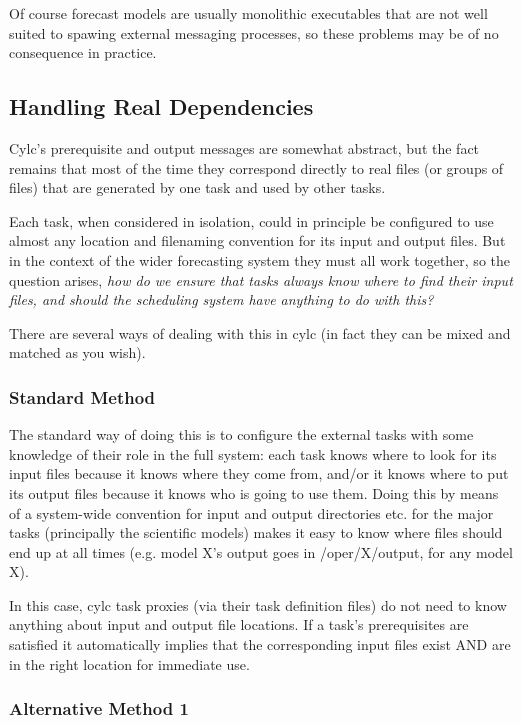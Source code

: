\documentclass[11pt,a4paper]{article}
\begin{document}
Of course forecast models are usually monolithic executables that are not
well suited to spawing external messaging processes, so these problems
may be of no consequence in practice.

\pagebreak

\subsection{Handling Real Dependencies}
\label{HandlingRealDependencies}

Cylc's prerequisite and output messages are somewhat abstract, but the
fact remains that most of the time they correspond directly to real 
files (or groups of files) that are generated by one task and used by
other tasks.

Each task, when considered in isolation, could in principle be
configured to use almost any location and filenaming convention for its
input and output files. But in the context of the wider forecasting
system they must all work together, so the question arises, {\em how do
we ensure that tasks always know where to find their input files, and
should the scheduling system have anything to do with this?} 

There are several ways of dealing with this in cylc (in fact they can
be mixed and matched as you wish). 

\subsubsection{Standard Method}

The standard way of doing this is to configure the external tasks with
some knowledge of their role in the full system: each task knows where
to look for its input files because it knows where they come from,
and/or it knows where to put its output files because it knows who is
going to use them. Doing this by means of a system-wide convention for 
input and output directories  etc. for the major tasks (principally the
scientific models) makes it easy to know where files should end up at
all times (e.g. model X's output goes in /oper/X/output, for any model
X).

In this case, cylc task proxies (via their task definition files) do not
need to know anything about input and output file locations. If a task's
prerequisites are satisfied it automatically implies that the
corresponding input files exist AND are in the right location for
immediate use.

\subsubsection{Alternative Method 1}
\end{document}
